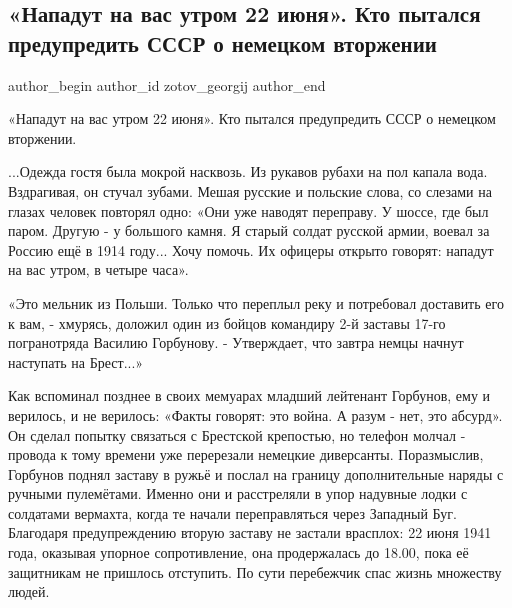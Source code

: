  
 
 
 
 
 
\subsection{«Нападут на вас утром 22 июня». Кто пытался предупредить СССР о немецком вторжении}
\label{sec:22_06_2021.fb.zotov_georgij.1.napadenie_22_06_1941_perebezhchiki}
\ifcmt
 author_begin
   author_id zotov_georgij
 author_end
\fi

«Нападут на вас утром 22 июня». Кто пытался предупредить СССР о немецком вторжении.

...Одежда гостя была мокрой насквозь. Из рукавов рубахи на пол капала вода.
Вздрагивая, он стучал зубами. Мешая русские и польские слова, со слезами на
глазах человек повторял одно: «Они уже наводят переправу. У шоссе, где был
паром. Другую - у большого камня. Я старый солдат русской армии, воевал за
Россию ещё в 1914 году... Хочу помочь. Их офицеры открыто говорят: нападут на
вас утром, в четыре часа».

«Это мельник из Польши. Только что переплыл реку и потребовал доставить его к
вам, - хмурясь, доложил один из бойцов командиру 2-й заставы 17-го погранотряда
Василию Горбунову. - Утверждает, что завтра немцы начнут наступать на Брест...»

Как вспоминал позднее в своих мемуарах младший лейтенант Горбунов, ему и
верилось, и не верилось: «Факты говорят: это война. А разум - нет, это абсурд».
Он сделал попытку связаться с Брестской крепостью, но телефон молчал - провода
к тому времени уже перерезали немецкие диверсанты. Поразмыслив, Горбунов поднял
заставу в ружьё и послал на границу дополнительные наряды с ручными пулемётами.
Именно они и расстреляли в упор надувные лодки с солдатами вермахта, когда те
начали переправляться через Западный Буг. Благодаря предупреждению вторую
заставу не застали врасплох: 22 июня 1941 года, оказывая упорное сопротивление,
она продержалась до 18.00, пока её защитникам не пришлось отступить. По сути
перебежчик спас жизнь множеству людей.


